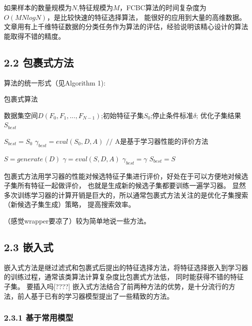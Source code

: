\documentclass[a4paper,UTF8]{article}
\begin{document}
如果样本的数量规模为$N$,特征规模为$M$，FCBC算法的时间复杂度为$O(MNlogN)$，是比较快速的特征选择算法，
能很好的应用到大量的高维数据。文章用有上千维特征数据的分类任务作为算法的评估，经验说明该精心设计的算法能取得不错的精度。






\subsection*{2.2 包裹式方法}
算法的统一形式（见Algorithm 1):

\begin{algorithm}
  \caption{包裹式算法}
  \begin{algorithmic}[1]
    \REQUIRE 数据集空间$D(F_{0}, F_{1},..., F_{N-1})$;初始特征子集$S_{0}$;停止条件标准$\delta$;
    \ENSURE 优化子集结果$S_{best}$

    \STATE $S_{best}=S_{0}$
    \STATE $\gamma_{best}=eval(S_{0},D,A)$          $//$ A是基于学习器性能的评价方法

      \STATE $S=generate(D)$
      \STATE $\gamma=eval(S,D,A)$
          \STATE $\gamma_{best}=\gamma$
          \STATE $S_{best}=S$
        \ENDIF
    \ENDWHILE


  \end{algorithmic}
\end{algorithm}


包裹式方法用学习器的性能对候选特征子集进行评价，好处在于可以方便地对候选子集所有特征一起做评价，
也就是生成新的候选子集都要训练一遍学习器。
显然多次训练学习器的计算开销是巨大的，所以通常包裹式方法关注的是优化子集搜索（新候选子集生成）策略，
提高搜索效率。

（感觉wrapper要凉了）较为简单地说一些方法。


\subsection*{2.3 嵌入式}

嵌入式方法是继过滤式和包裹式后提出的特征选择方法，将特征选择嵌入到学习器的训练过程，通常该类算法计算复杂度比包裹式方法低，
同时能获得不错的特征子集。
要插入吗[????]
嵌入式方法结合了前两种方法的优势，是十分流行的方法，前人基于已有的学习器模型提出了一些精致的方法。

\subsubsection*{2.3.1 基于常用模型}
\end{document}
